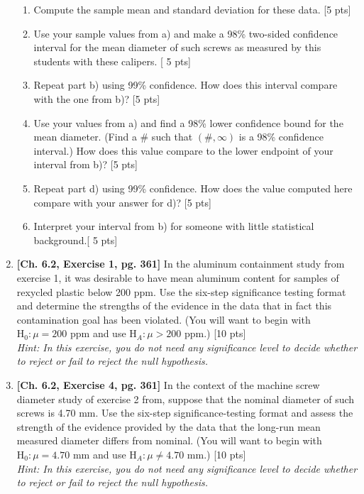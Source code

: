 \documentclass[11pt]{article}\usepackage[]{graphicx}\usepackage[]{color}
\begin{document}
\begin{enumerate}
      \begin{enumerate}
          \item Compute the sample mean and standard deviation for these data. [5 pts]
          \item Use your sample values from a) and make a 98\% two-sided confidence interval for the mean diameter of such screws as measured by this students with these calipers. [ 5 pts]
          \item Repeat part b) using 99\% confidence. How does this interval compare with the one from b)? [5 pts]
          \item Use your values from a) and find a 98\% lower confidence bound for the mean diameter. (Find a # such that $(\#, \infty)$ is a 98\% confidence interval.) How does this value compare to the lower endpoint of your interval from b)? [5 pts]
          \item Repeat part d) using 99\% confidence. How does the value computed here compare with your answer for d)? [5 pts]
          \item Interpret your interval from b) for someone with little statistical background.[ 5 pts]
    \end{enumerate}
    
\item\textbf {[Ch. 6.2, Exercise 1, pg. 361]} In the aluminum containment study from exercise 1, it was desirable to have mean aluminum content for samples of rexycled plastic below 200 ppm. Use the six-step significance testing format and determine the strengths of the evidence in the data that in fact this contamination goal has been violated. (You will want to begin with $\text{H}_0: \mu = 200$ ppm and use $\text{H}_A: \mu > 200$ ppm.) [10 pts]\\
\emph{Hint: In this exercise, you do not need any significance level to decide whether to reject or fail to reject the null hypothesis.}

\item\textbf {[Ch. 6.2, Exercise 4, pg. 361]} In the context of the machine screw diameter study of exercise 2 from, suppose that the nominal diameter of such screws is 4.70 mm. Use the six-step significance-testing format and assess the strength of the evidence provided by the data that the long-run mean measured diameter differs from nominal. (You will want to begin with $\text{H}_0: \mu = 4.70$ mm and use $\text{H}_A: \mu \not= 4.70$ mm.) [10 pts]\\
\emph{Hint: In this exercise, you do not need any significance level to decide whether to reject or fail to reject the null hypothesis.}
  

\end{enumerate}
\end{document}
